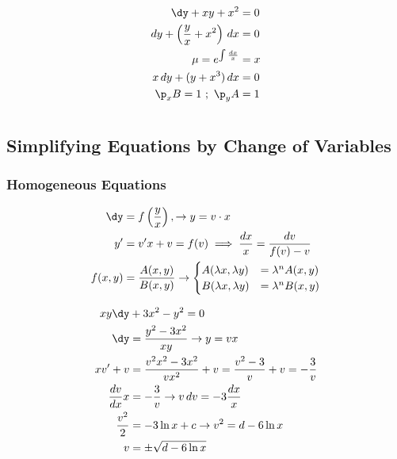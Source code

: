 \documentclass[Maths.tex]{subfiles}
\begin{document}
\begin{example}
    \begin{align}
        \dy + xy + x^2 &= 0 \\
        dy + \left(\frac{y}{x} + x^2\right)\,dx &= 0 \\
        \mu = e^{\int \frac{dx}{x}} &= x \\
        x\,dy + (y + x^3)\,dx &= 0 \\
        \p_xB = 1 ~;~ \p_yA &= 1
    \end{align}
\end{example}

\chapter{}

\section{Simplifying Equations by Change of Variables}
\subsection{Homogeneous Equations}
\begin{align}
    \dy &= f\left(\frac{y}{x}\right), \to y = v\cdot x \\
    y' &= v'x + v = f(v) \implies \frac{dx}{x} = \frac{dv}{f(v) - v} \\
    f(x, y) &= \frac{A(x,y)}{B(x,y)} \to \begin{cases} A(\lambda x, \lambda y) &= \lambda^{n}A(x,y) \\
    B(\lambda x, \lambda y) &= \lambda^n B(x,y) \end{cases}
\end{align}

\begin{example}
\begin{align}
    xy\dy &+ 3x^2 - y^2 = 0 \\
    \dy &= \frac{y^2 - 3x^2}{xy} \to y = vx \\
    xv' + v &= \frac{v^2x^2 - 3x^2}{vx^2} + v = \frac{v^2 - 3}{v} + v = -\frac{3}{v} \\
    \frac{dv}{dx}x &= -\frac{3}{v} \to v\,dv = -3\frac{dx}{x} \\
    \frac{v^2}{2} &= -3\ln{x} + c \to v^2 = d - 6\ln{x} \\
    v &= \pm \sqrt{d - 6\ln{x}}
\end{align}
\end{example}
\end{document}
